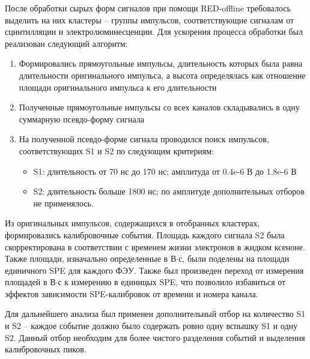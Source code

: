 После обработки сырых форм сигналов при помощи RED-offline требовалось выделить на них кластеры -- группы импульсов, соответствующие сигналам от сцинтилляции и электролюминесценции. Для ускорения процесса обработки был реализован следующий алгоритм:
\begin{enumerate}
    \item Формировались прямоугольные импульсы, длительность которых была равна длительности оригинального импульса, а высота определялась как отношение площади оригинального импульса к его длительности
    \item Полученные прямоугольные импульсы со всех каналов складывались в одну суммарную псевдо-форму сигнала
    \item На полученной псевдо-форме сигнала проводился поиск импульсов, соответствующих S1 и S2 по следующим критериям:
    \begin{itemize}
        \item S1: длительность от 70 нс до 170 нс; амплитуда от 0.4e-6 В до 1.8e-6 В 
        \item S2: длительность больше 1800 нс; по амплитуде дополнительных отборов не применялось.
    \end{itemize}
\end{enumerate}
Из оригинальных импульсов, содержащихся в отобранных кластерах, формировались калибровочные события. Площадь каждого сигнала S2 была скорректирована в соответствии с временем жизни электронов в жидком ксеноне. Также площади, изначально определенные в В$\cdot$с, были поделены на площади единичного SPE для каждого ФЭУ. 
Также был произведен переход от измерения площадей в В$\cdot$с к измерению в единицых SPE, что позволило избавиться от эффектов зависимости SPE-калибровок от времени и номера канала.

Для дальнейшего анализа был применен дополнительный отбор на количество S1 и S2 -- каждое событие должно было содержать ровно одну вспышку S1 и одну S2. Данный отбор необходим для более чистого разделения событий и выделения калибровочных пиков.


